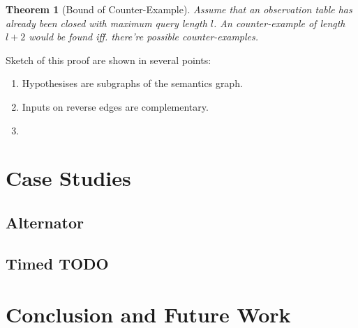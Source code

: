 \documentclass[conference, a4paper]{IEEEtran}
\newtheorem{theorem}{Theorem}
\begin{document}
\begin{theorem}[Bound of Counter-Example]
  \label{the:cebound} Assume that an observation table has already been closed with maximum
  query length  $l$. An counter-example of length $l+2$ would be
  found iff. there're possible counter-examples.
\end{theorem}
\begin{IEEEproof}
  Sketch of this proof are shown in several points:
  \begin{enumerate}
    \item Hypothesises are subgraphs of the semantics graph.
    \item Inputs on reverse edges are complementary.
    \item 
  \end{enumerate}
\end{IEEEproof}

\section{Case Studies}
\subsection{Alternator}
\subsection{Timed TODO}

\section{Conclusion and Future Work}






\listoftodos
\end{document}

